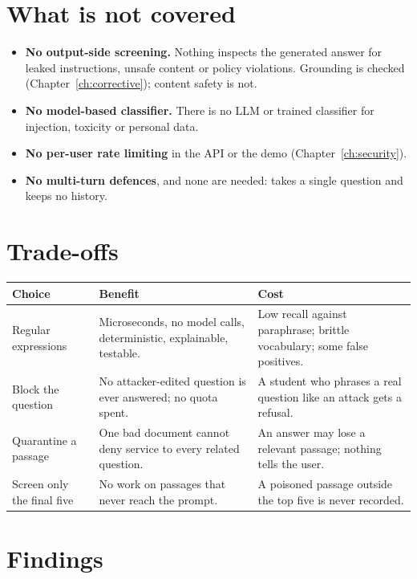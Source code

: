 \section{What is not covered}

\begin{itemize}
  \item \textbf{No output-side screening.} Nothing inspects the generated answer for leaked instructions, unsafe content or policy violations. Grounding is checked (Chapter~\ref{ch:corrective}); content safety is not.
  \item \textbf{No model-based classifier.} There is no LLM or trained classifier for injection, toxicity or personal data.
  \item \textbf{No per-user rate limiting} in the API or the demo (Chapter~\ref{ch:security}).
  \item \textbf{No multi-turn defences}, and none are needed:  takes a single question and keeps no history.
\end{itemize}

\section{Trade-offs}

\begin{center}
\begin{tabularx}{\textwidth}{@{}>{\raggedright\arraybackslash}p{3.4cm}LL@{}}
\toprule
\textbf{Choice} & \textbf{Benefit} & \textbf{Cost}\\
\midrule
Regular expressions & Microseconds, no model calls, deterministic, explainable, testable. & Low recall against paraphrase; brittle vocabulary; some false positives.\\
Block the question & No attacker-edited question is ever answered; no quota spent. & A student who phrases a real question like an attack gets a refusal.\\
Quarantine a passage & One bad document cannot deny service to every related question. & An answer may lose a relevant passage; nothing tells the user.\\
Screen only the final five & No work on passages that never reach the prompt. & A poisoned passage outside the top five is never recorded.\\
\bottomrule
\end{tabularx}
\end{center}

\section{Findings}

